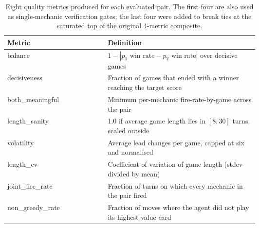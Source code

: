 \documentclass[conference]{IEEEtran}
\begin{document}
  \begin{table}[ht!]                                                            
  \centering                                                                  
  \caption{Eight quality metrics produced for each evaluated pair. The first
  four are also used as single-mechanic verification gates; the last four were
  added to break ties at the saturated top of the original 4-metric composite.}
  \label{tab:metrics}                              
  \begin{tabular}{|l|p{0.6\linewidth}|}        
  \hline                                
  \textbf{Metric} & \textbf{Definition} \\
  \hline                    
  balance & $1 - |p_1\text{ win rate} - p_2\text{ win rate}|$ over decisive
  games \\                                                                      
  \hline                                                             
  decisiveness & Fraction of games that ended with a winner reaching the target 
  score \\                                                                    
  \hline                                
  both\_meaningful & Minimum per-mechanic fire-rate-by-game across the pair \\
  \hline                                                                        
  length\_sanity & 1.0 if average game length lies in $[8, 30]$ turns; scaled
  outside \\                                                                    
  \hline                                                                      
  volatility & Average lead changes per game, capped at six and normalised \\   
  \hline                                                                      
  length\_cv & Coefficient of variation of game length (stdev divided by mean)
  \\                                                                            
  \hline                                                                        
  joint\_fire\_rate & Fraction of turns on which every mechanic in the pair     
  fired \\                                                                      
  \hline                                                                      
  non\_greedy\_rate & Fraction of moves where the agent did not play its        
  highest-value card \\                                                       
  \hline                                                             
  \end{tabular}                                                                 
  \end{table}
\end{document}
